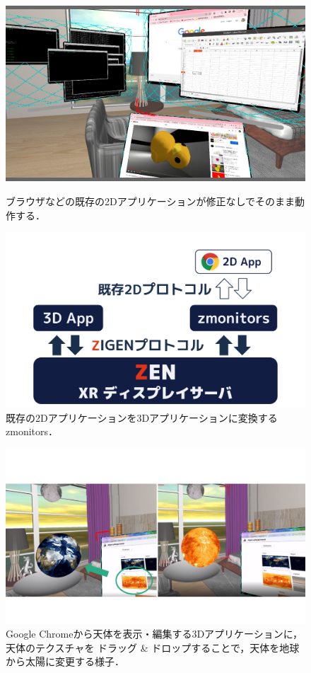 \begin{figure}[htbp]
  \begin{minipage}[t]{0.50\linewidth}
    \centering
    \includegraphics[keepaspectratio, width=\linewidth]{fig/2d-apps.png}
    \caption{
      ブラウザなどの既存の2Dアプリケーションが修正なしでそのまま動作する．
    }
    \label{fig:2d-apps}
  \end{minipage}
  \begin{minipage}[t]{0.50\linewidth}
    \centering
    \includegraphics[keepaspectratio, width=\linewidth]{fig/zmonitors.png}
    \caption{
      既存の2Dアプリケーションを3Dアプリケーションに変換するzmonitors．
    }
    \label{fig:zmonitors}
  \end{minipage}
\end{figure}

\begin{figure}[htbp]
  \centering
  \includegraphics[keepaspectratio, width=0.7\linewidth]{fig/dnd.png}
  \caption{
    Google Chromeから天体を表示・編集する3Dアプリケーションに，天体のテクスチャを
    ドラッグ \& ドロップすることで，天体を地球から太陽に変更する様子．
  }
  \label{fig:dnd}
\end{figure}

